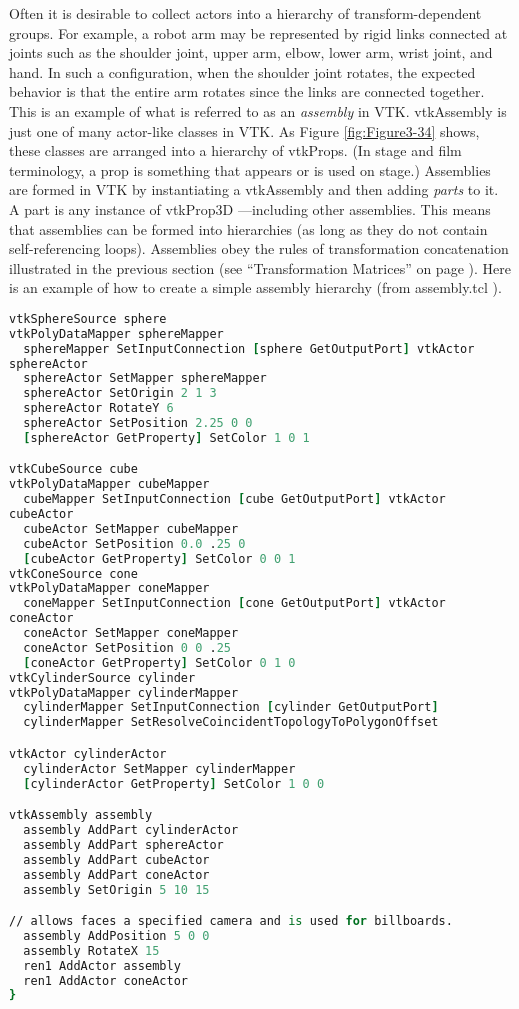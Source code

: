 Often it is desirable to collect actors into a hierarchy of transform-dependent groups. For example, a robot arm may be represented by rigid links connected at joints such as the shoulder joint, upper arm, elbow, lower arm, wrist joint, and hand. In such a configuration, when the shoulder joint rotates, the expected behavior is that the entire arm rotates since the links are connected together. This is an example of what is referred to as an \emph{assembly} in VTK. vtkAssembly is just one of many actor-like classes in VTK. As Figure \ref{fig:Figure3-34} shows, these classes are arranged into a hierarchy of vtkProps. (In stage and film terminology, a prop is something that appears or is used on stage.) Assemblies are formed in VTK by instantiating a vtkAssembly and then adding \emph{parts} to it. A part is any instance of vtkProp3D ---including other assemblies. This means that assemblies can be formed into hierarchies (as long as they do not contain self-referencing loops). Assemblies obey the rules of transformation concatenation illustrated in the previous section (see ``Transformation Matrices'' on page \pageref{subsec:transform_matrices} ). Here is an example of how to create a simple assembly hierarchy (from assembly.tcl ).

\begin{lstlisting}[language=TCL, caption={Part of assembly.tcl}]
vtkSphereSource sphere
vtkPolyDataMapper sphereMapper
  sphereMapper SetInputConnection [sphere GetOutputPort] vtkActor
sphereActor
  sphereActor SetMapper sphereMapper
  sphereActor SetOrigin 2 1 3
  sphereActor RotateY 6
  sphereActor SetPosition 2.25 0 0
  [sphereActor GetProperty] SetColor 1 0 1

vtkCubeSource cube
vtkPolyDataMapper cubeMapper
  cubeMapper SetInputConnection [cube GetOutputPort] vtkActor
cubeActor
  cubeActor SetMapper cubeMapper
  cubeActor SetPosition 0.0 .25 0
  [cubeActor GetProperty] SetColor 0 0 1
vtkConeSource cone
vtkPolyDataMapper coneMapper
  coneMapper SetInputConnection [cone GetOutputPort] vtkActor
coneActor
  coneActor SetMapper coneMapper
  coneActor SetPosition 0 0 .25
  [coneActor GetProperty] SetColor 0 1 0
vtkCylinderSource cylinder
vtkPolyDataMapper cylinderMapper
  cylinderMapper SetInputConnection [cylinder GetOutputPort]
  cylinderMapper SetResolveCoincidentTopologyToPolygonOffset

vtkActor cylinderActor
  cylinderActor SetMapper cylinderMapper
  [cylinderActor GetProperty] SetColor 1 0 0

vtkAssembly assembly
  assembly AddPart cylinderActor
  assembly AddPart sphereActor
  assembly AddPart cubeActor
  assembly AddPart coneActor
  assembly SetOrigin 5 10 15

// allows faces a specified camera and is used for billboards.
  assembly AddPosition 5 0 0
  assembly RotateX 15
  ren1 AddActor assembly
  ren1 AddActor coneActor
}
\end{lstlisting}

